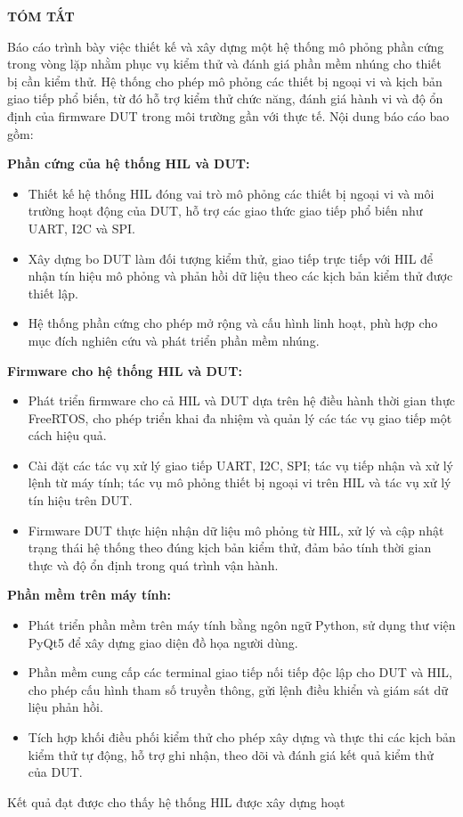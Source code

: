\begin{center}
	{\fontsize{24pt}{24pt}\textbf{TÓM TẮT}}
\end{center}

Báo cáo trình bày việc thiết kế và xây dựng một hệ thống mô phỏng phần cứng trong vòng lặp nhằm phục vụ kiểm thử và đánh giá phần mềm nhúng cho thiết bị cần kiểm thử. Hệ thống cho phép mô phỏng các thiết bị ngoại vi và kịch bản giao tiếp phổ biến, từ đó hỗ trợ kiểm thử chức năng, đánh giá hành vi và độ ổn định của firmware DUT trong môi trường gần với thực tế. Nội dung báo cáo bao gồm:

\textbf{Phần cứng của hệ thống HIL và DUT:}
\begin{itemize}
    \item Thiết kế hệ thống HIL đóng vai trò mô phỏng các thiết bị ngoại vi và môi trường hoạt động của DUT, hỗ trợ các giao thức giao tiếp phổ biến như UART, I2C và SPI.
    \item Xây dựng bo DUT làm đối tượng kiểm thử, giao tiếp trực tiếp với HIL để nhận tín hiệu mô phỏng và phản hồi dữ liệu theo các kịch bản kiểm thử được thiết lập.
    \item Hệ thống phần cứng cho phép mở rộng và cấu hình linh hoạt, phù hợp cho mục đích nghiên cứu và phát triển phần mềm nhúng.
\end{itemize}

\textbf{Firmware cho hệ thống HIL và DUT:}
\begin{itemize}
    \item Phát triển firmware cho cả HIL và DUT dựa trên hệ điều hành thời gian thực FreeRTOS, cho phép triển khai đa nhiệm và quản lý các tác vụ giao tiếp một cách hiệu quả.
    \item Cài đặt các tác vụ xử lý giao tiếp UART, I2C, SPI; tác vụ tiếp nhận và xử lý lệnh từ máy tính; tác vụ mô phỏng thiết bị ngoại vi trên HIL và tác vụ xử lý tín hiệu trên DUT.
    \item Firmware DUT thực hiện nhận dữ liệu mô phỏng từ HIL, xử lý và cập nhật trạng thái hệ thống theo đúng kịch bản kiểm thử, đảm bảo tính thời gian thực và độ ổn định trong quá trình vận hành.
\end{itemize}

\textbf{Phần mềm trên máy tính:}
\begin{itemize}
    \item Phát triển phần mềm trên máy tính bằng ngôn ngữ Python, sử dụng thư viện PyQt5 để xây dựng giao diện đồ họa người dùng.
    \item Phần mềm cung cấp các terminal giao tiếp nối tiếp độc lập cho DUT và HIL, cho phép cấu hình tham số truyền thông, gửi lệnh điều khiển và giám sát dữ liệu phản hồi.
    \item Tích hợp khối điều phối kiểm thử cho phép xây dựng và thực thi các kịch bản kiểm thử tự động, hỗ trợ ghi nhận, theo dõi và đánh giá kết quả kiểm thử của DUT.
\end{itemize}

Kết quả đạt được cho thấy hệ thống HIL được xây dựng hoạt

